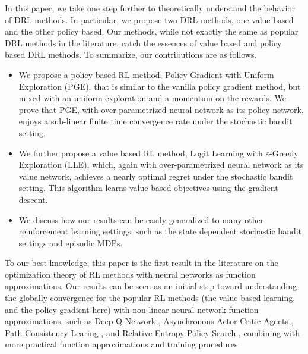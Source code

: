 In this paper, we take one step further to theoretically understand the behavior of DRL methods. In particular, we propose two DRL methods, one value based and the other policy based. Our methods, while not exactly the same as popular DRL methods in the literature, catch the essences of value based and policy based DRL methods. To summarize, our contributions are as follows.
\begin{itemize}
	\item We propose a policy based RL method, Policy Gradient with Uniform Exploration (PGE), that is similar to the vanilla policy gradient method, but mixed with an uniform exploration and a momentum on the rewards. We prove that PGE, with over-parametrized neural network as its policy network, enjoys a sub-linear finite time convergence rate under the stochastic bandit setting.
	\item We further propose a value based RL method, Logit Learning with $\varepsilon$-Greedy Exploration (LLE), which, again with over-parametrized neural network as its value network, achieves a nearly optimal regret under the stochastic bandit setting. This algorithm learns value based objectives using the gradient descent. 
	\item We discuss how our results can be easily generalized to many other reinforcement learning settings, such as the state dependent stochastic bandit settings and episodic MDPs.
\end{itemize}

To our best knowledge, this paper is the first result in the literature on the optimization theory of RL methods with neural networks as function approximations. Our results can be seen as an initial step toward understanding the globally convergence for the popular RL methods (the value based learning, and the policy gradient here) with non-linear neural network function approximations, such as Deep Q-Network \cite{mnih2015human}, Asynchronous Actor-Critic Agents \citep{mnih2016asynchronous}, Path Consistency Learing \citep{nachum2017bridging}, and Relative Entropy Policy Search \citep{peters2010relative}, combining with more practical function approximations and training procedures.

